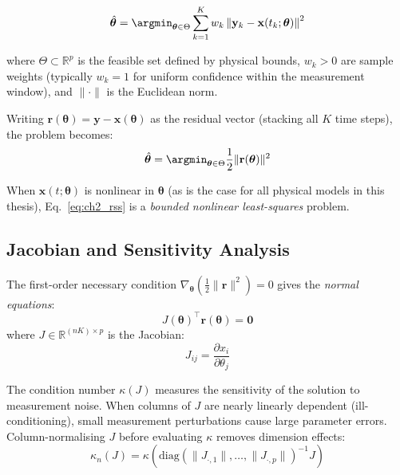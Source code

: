 \begin{equation}
  \hat{\bm{\theta}} = \argmin_{\bm{\theta} \in \Theta}
    \sum_{k=1}^{K} w_k \left\|\mathbf{y}_k - \mathbf{x}(t_k;\bm{\theta})\right\|^2
  \label{eq:ch2_lsq}
\end{equation}

where $\Theta \subset \mathbb{R}^p$ is the feasible set defined by physical
bounds, $w_k > 0$ are sample weights (typically $w_k = 1$ for uniform
confidence within the measurement window), and $\|\cdot\|$ is the Euclidean
norm.

Writing $\mathbf{r}(\bm{\theta}) = \mathbf{y} - \mathbf{x}(\bm{\theta})$
as the residual vector (stacking all $K$ time steps), the problem becomes:
\begin{equation}
  \hat{\bm{\theta}} = \argmin_{\bm{\theta} \in \Theta}
    \frac{1}{2}\|\mathbf{r}(\bm{\theta})\|^2
  \label{eq:ch2_rss}
\end{equation}

When $\mathbf{x}(t;\bm{\theta})$ is nonlinear in $\bm{\theta}$ (as is the
case for all physical models in this thesis), Eq.~\eqref{eq:ch2_rss} is a
\emph{bounded nonlinear least-squares} problem.

\subsection{Jacobian and Sensitivity Analysis}

The first-order necessary condition $\nabla_{\bm{\theta}}(\frac{1}{2}\|\mathbf{r}\|^2) = 0$
gives the \emph{normal equations}:
\begin{equation}
  J(\bm{\theta})^\top \mathbf{r}(\bm{\theta}) = \mathbf{0}
  \label{eq:ch2_normal}
\end{equation}
where $J \in \mathbb{R}^{(nK) \times p}$ is the Jacobian:
\begin{equation}
  J_{ij} = \frac{\partial x_i}{\partial \theta_j}
  \label{eq:ch2_jacobian}
\end{equation}

The condition number $\kappa(J)$ measures the sensitivity of the solution
to measurement noise. When columns of $J$ are nearly linearly dependent
(ill-conditioning), small measurement perturbations cause large parameter
errors. Column-normalising $J$ before evaluating $\kappa$ removes
dimension effects:
\begin{equation}
  \kappa_n(J) = \kappa\left(\mathrm{diag}(\|J_{\cdot,1}\|,\ldots,\|J_{\cdot,p}\|)^{-1} J\right)
  \label{eq:ch2_kappan}
\end{equation}


